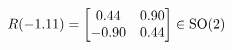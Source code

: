 \documentclass[preview]{standalone}
\begin{document}
\begin{align*}
\special{dvisvgm:raw <g id='unique000'>}R(-1.11) = \begin{bmatrix} 0.44 & 0.90 \\ -0.90 & 0.44 \end{bmatrix} \in \text{SO}(2)\special{dvisvgm:raw </g>}
\end{align*}
\end{document}
